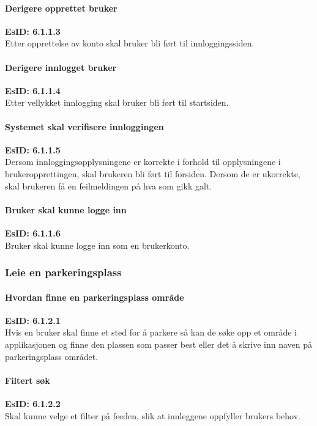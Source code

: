 \documentclass[12pt]{article}
\newcommand{\EsID}[1]{\textbf{EsID: #1}\\}
\begin{document}
            \paragraph{Derigere opprettet bruker}
            \EsID{6.1.1.3}
            Etter opprettelse av konto skal bruker bli ført til innloggingssiden.

            \paragraph{Derigere innlogget bruker}
            \EsID{6.1.1.4}
            Etter vellykket innlogging skal bruker bli ført til startsiden.

            \paragraph{Systemet skal verifisere innloggingen}
            \EsID{6.1.1.5}
            Dersom innloggingsopplysningene er korrekte i forhold til opplysningene i brukeropprettingen, skal brukeren bli ført til forsiden. Dersom de er ukorrekte, skal brukeren få en feilmeldingen på hva som gikk galt.

            \paragraph{Bruker skal kunne logge inn}
            \EsID{6.1.1.6}
            Bruker skal kunne logge inn som en brukerkonto.
        
        \subsubsection{Leie en parkeringsplass}

            \paragraph{Hvordan finne en parkeringsplass område}
            \EsID{6.1.2.1}
            Hvis en bruker skal finne et sted for å parkere så kan de søke opp et område i applikasjonen og finne den plassen som passer best eller det å skrive inn naven på parkeringsplass området.

            \paragraph{Filtert søk}
            \EsID{6.1.2.2}
            Skal kunne velge et filter på feeden, slik at innleggene oppfyller brukers behov.
\end{document}
